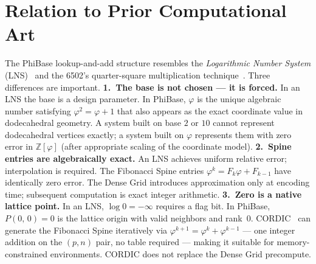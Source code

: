 \documentclass[12pt]{article}
\theoremstyle{definition}
\theoremstyle{remark}
\newcommand{\Zphi}{\mathbb{Z}[\varphi]}
\newcommand{\Phib}[2]{P(#1,\,#2)}
\begin{document}
\section{Relation to Prior Computational Art}
\label{sec:related}
The PhiBase lookup-and-add structure resembles the \emph{Logarithmic
Number System} (LNS)~\cite{lewis1975} and the 6502's quarter-square
multiplication technique~\cite{6502}.  Three differences are important.
\medskip
\noindent\textbf{1.\ The base is not chosen --- it is forced.}
In an LNS the base is a design parameter.  In PhiBase, $\varphi$ is
the unique algebraic number satisfying $\varphi^2=\varphi+1$ that also
appears as the exact coordinate value in dodecahedral geometry.
A system built on base $2$ or $10$ cannot represent dodecahedral
vertices exactly; a system built on $\varphi$ represents them with
zero error in $\Zphi$ (after appropriate scaling of the coordinate model).
\medskip
\noindent\textbf{2.\ Spine entries are algebraically exact.}
An LNS achieves uniform relative error; interpolation is required.
The Fibonacci Spine entries $\varphi^k=F_k\varphi+F_{k-1}$ have
identically zero error.  The Dense Grid introduces approximation only
at encoding time; subsequent computation is exact integer arithmetic.
\medskip
\noindent\textbf{3.\ Zero is a native lattice point.}
In an LNS, $\log 0=-\infty$ requires a flag bit.  In PhiBase,
$\Phib{0}{0}=0$ is the lattice origin with valid neighbors and rank~0.
\medskip
CORDIC~\cite{volder1959} can generate the Fibonacci Spine iteratively
via $\varphi^{k+1}=\varphi^k+\varphi^{k-1}$ --- one integer addition
on the $(p,n)$ pair, no table required --- making it suitable for
memory-constrained environments.  CORDIC does not replace the Dense
Grid precompute.
\end{document}
